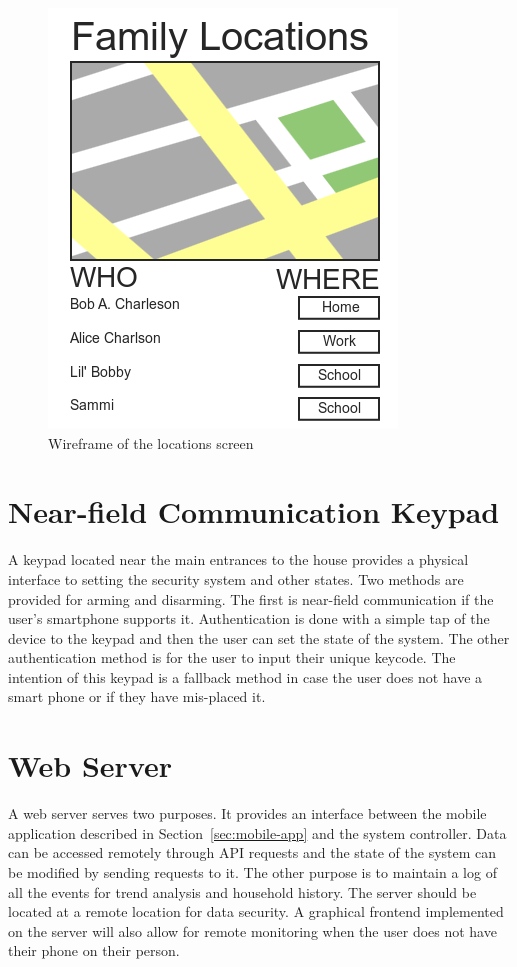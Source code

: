 \documentclass{report}
\begin{document}
\begin{figure}[H]
    \centering
    \includegraphics[scale=0.5]{mock_locations}
    \caption[Wireframe of the locations screen]
            {Wireframe of the locations screen}
    \label{fig:wireframe-locations}
\end{figure}



\section{Near-field Communication Keypad}
A keypad located near the main entrances to the house provides a physical
interface to setting the security system and other states. Two methods are
provided for arming and disarming. The first is near-field communication if the
user's smartphone supports it. Authentication is done with a simple tap of the
device to the keypad and then the user can set the state of the system. The
other authentication method is for the user to input their unique keycode. The
intention of this keypad is a fallback method in case the user does not have a
smart phone or if they have mis-placed it.

\section{Web Server}
\label{sec:web-server}
A web server serves two purposes. It provides an interface between the mobile
application described in Section~\ref{sec:mobile-app} and the system
controller. Data can be accessed remotely through API requests and the state of
the system can be modified by sending requests to it. The other purpose is to
maintain a log of all the events for trend analysis and household history. The
server should be located at a remote location for data security.  A graphical
frontend implemented on the server will also allow for remote monitoring when
the user does not have their phone on their person. 
\end{document}
